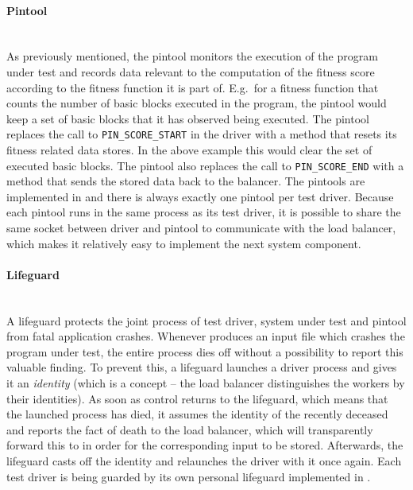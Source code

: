   \paragraph{Pintool} ~\\
  As previously mentioned, the pintool monitors the execution of the program under test and records
  data relevant to the computation of the fitness score according to the fitness function it is part of.
  E.g.\ for a fitness function that counts the number of basic blocks executed in the program, the pintool 
  would keep a set of basic blocks that it has observed being executed. The pintool replaces the call to 
  \texttt{PIN\_SCORE\_START} in the driver with a method that resets its fitness related data stores. In the 
  above example this would clear the set of executed basic blocks. The pintool also replaces the call to
  \texttt{PIN\_SCORE\_END} with a method that sends the stored data back to the balancer. 
  The pintools are implemented in \cpp and there is always exactly one pintool per test driver.
  Because each pintool runs in the same process as its test driver, it is possible to share the same \zmq
  socket between driver and pintool to communicate with the load balancer, which makes it relatively
  easy to implement the next system component.
  \paragraph{Lifeguard} ~\\
  A lifeguard protects the joint process of test driver, system under test and pintool from fatal application
  crashes. Whenever \xmlmate produces an input file which crashes the program under test, the entire process
  dies off without a possibility to report this valuable finding. To prevent this, a lifeguard launches a
  driver process and gives it an \emph{identity} (which is a \zmq concept -- the load balancer distinguishes
  the workers by their identities). As soon as control returns to the lifeguard, which means that the launched
  process has died, it assumes the identity of the recently deceased and reports the fact of death to the load balancer, which will transparently forward this to \xmlmate in order for the corresponding input to be
  stored. Afterwards, the lifeguard casts off the identity and relaunches the driver with it once again.
  Each test driver is being guarded by its own personal lifeguard implemented in \python.
